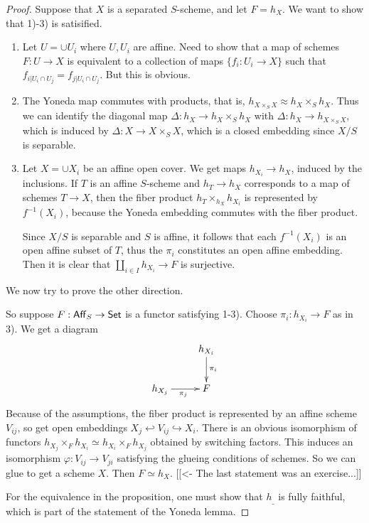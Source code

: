 \documentclass[11pt, english]{article}
\begin{document}
\begin{proof}
Suppose that $X$ is a separated $S$-scheme, and let $F=h_X$. We want to show that 1)-3) is satisified.
\begin{enumerate}
\item Let $U=\cup U_i$ where $U, U_i$ are affine. Need to show that a map of schemes $F:U \to X$ is equivalent to a collection of maps $\{ f_i:U_i \to X \}$ such that $f_{i|U_i \cap U_j} = f_{j|U_i \cap U_j}$. But this is obvious.

\item The Yoneda map commutes with products, that is, $h_{X \times_S X} \approx h_X \times_S h_X$. Thus we can identify the diagonal map $\Delta:h_X \to h_X \times_S h_X$ with $\Delta:h_X \to h_{X \times_S X}$, which is induced by $\Delta: X \to X \times_S X$, which is a closed embedding since $X/S$ is separable.

\item
Let $X = \cup X_i$ be an affine open cover. We get maps $h_{X_i} \to h_X$, induced by the inclusions. If $T$ is an affine $S$-scheme and $h_T \to h_X$ corresponds to a map of schemes $T \to X$, then the fiber product $h_T \times_{h_X} h_{X_i}$ is represented by $f^{-1}(X_i)$, because the Yoneda embedding commutes with the fiber product.

Since $X/S$ is separable and $S$ is affine, it follows that each $f^{-1}(X_i)$ is an open affine subset of $T$, thus the $\pi_i$ constitutes an open affine embedding. Then it is clear that $\coprod_{i \in I} h_{X_i} \to F$ is surjective.
\end{enumerate}
We now try to prove the other direction. 

So suppose $F:\mathsf{Aff}_S \to \mathsf{Set}$ is a functor satisfying 1-3). Choose $\pi_i:h_{X_i} \to F$ as in 3). We get a diagram
\[
\xymatrix{
 & h_{X_i} \ar[d]^{\pi_i} \\
h_{X_j} \ar[r]_{\pi_j} & F
}
\]
Because of the assumptions, the fiber product is represented by an affine scheme $V_{ij}$, so get open embeddings $X_j \hookleftarrow V_{ij} \hookrightarrow X_i$. There is an obvious isomorphism of functors $h_{X_j} \times_F h_{X_i} \simeq h_{X_i} \times_F h_{X_j}$ obtained by switching factors. This induces an isomorphism $\varphi:V_{ij} \to V_{ji}$ satisfying the glueing conditions of schemes. So we can glue to get a scheme $X$. Then $F \simeq h_X$. [[<- The last statement was an exercise...]]

For the equivalence in the proposition, one must show that $h_\_$ is fully faithful, which is part of the statement of the Yoneda lemma.
\end{proof}
\end{document}
